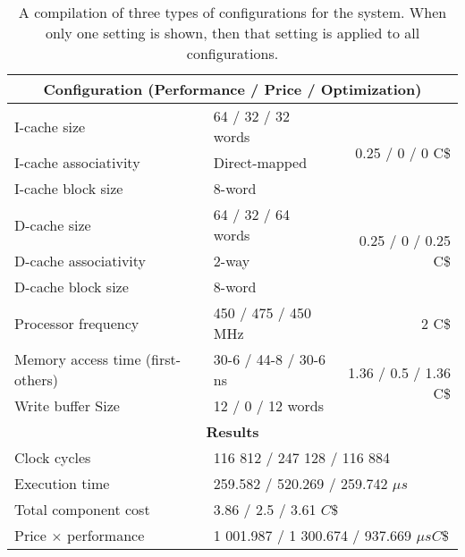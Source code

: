 \documentclass[a4paper,9pt,fleqn]{article}
\begin{document}
\begin{table}
	\center
	\small
	\def\arraystretch{1.2} 
	\begin{tabular}{|l|l|r|}
		\hline
		\multicolumn{3}{|c|}{\bf Configuration (Performance / Price / Optimization)} 																	\\ \hline
		I-cache size														& 64 / 32 / 32 words 		& \multirow{3}{*}{0.25 / 0 / 0 C\$} 					\\
		I-cache associativity 									& Direct-mapped					&																							\\ 
		I-cache block size		 									& 8-word								&																							\\ \hline
		D-cache size 		 												& 64 / 32 / 64 words		& \multirow{3}{*}{0.25 / 0 / 0.25 C\$} 				\\ 
		D-cache associativity 									& 2-way									&																							\\ 
		D-cache block size 		 									& 8-word								&																							\\ \hline
		Processor frequency		 									& 450 / 475 / 450 MHz		& 2 C\$																				\\ \hline
		Memory access time (first-others) 			& 30-6 / 44-8 / 30-6 ns	&	\multirow{2}{*}{1.36 / 0.5 / 1.36 C\$}			\\ 
		Write buffer Size 		 									& 12 / 0 / 12 words			&																							\\ \hline
		\multicolumn{3}{|c|}{\bf Results} 																																						\\ \hline
		Clock cycles 														& \multicolumn{2}{|l|}{116 812 / 247 128 / 116 884}										\\ 
		Execution time		 											& \multicolumn{2}{|l|}{259.582 / 520.269 / 259.742 $ \mu s $}		 			\\ 
		Total component cost 										& \multicolumn{2}{|l|}{3.86 / 2.5 / 3.61 $ C\$ $}											\\ 
		Price $ \times $ performance						& \multicolumn{2}{|l|}{1 001.987 / 1 300.674 / 937.669 $ \mu sC\$ $}	\\ \hline
	\end{tabular}
	\caption{A compilation of three types of configurations for the system. When only one setting is
		shown, then that setting is applied to all configurations.}
	\label{specs}
\end{table}
\end{document}
